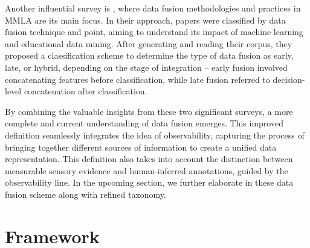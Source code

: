 \documentclass[manuscript,screen,review]{acmart}
\begin{document}
Another influential survey is \citet{chango_review_nodate}, where data fusion methodologies and practices in MMLA are its main focus. In their approach, papers were classified by data fusion technique and point, aiming to understand its impact of machine learning and educational data mining. After generating and reading their corpus, they proposed a classification scheme to determine the type of data fusion as early, late, or hybrid, depending on the stage of integration – early fusion involved concatenating features before classification, while late fusion referred to decision-level concatenation after classification. 

By combining the valuable insights from these two significant surveys, a more complete and current understanding of data fusion emerges. This improved definition seamlessly integrates the idea of observability, capturing the process of bringing together different sources of information to create a unified data representation. This definition also takes into account the distinction between measurable sensory evidence and human-inferred annotations, guided by the observability line. In the upcoming section, we further elaborate in these data fusion scheme along with refined taxonomy.

\section{Framework} \label{sec:framework}
\end{document}
